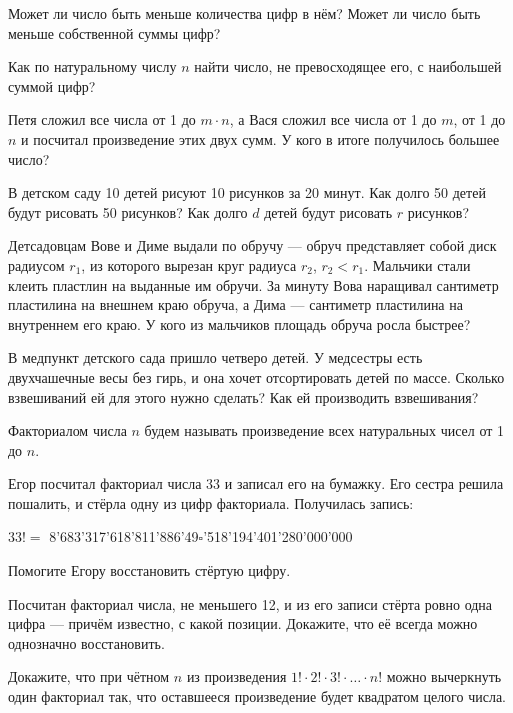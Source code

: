 \begin{itemize}
\itA Может ли число быть меньше количества цифр в нём? Может ли число быть меньше собственной суммы цифр?

\itB Как по натуральному числу $n$ найти число, не превосходящее его, с наибольшей суммой цифр?

\itC Петя сложил все числа от 1 до $m \cdot n$, а Вася сложил все числа от 1 до $m$, от 1 до $n$ и посчитал произведение этих двух сумм. У кого в итоге получилось большее число?
\end{itemize}

\begin{itemize}
\itA В детском саду 10 детей рисуют 10 рисунков за 20 минут. Как долго 50 детей будут рисовать 50 рисунков? Как долго $d$ детей будут рисовать $r$ рисунков?

\itB Детсадовцам Вове и Диме выдали по обручу — обруч представляет собой диск радиусом $r_1$, из которого вырезан круг радиуса $r_2$, $r_2<r_1$. Мальчики стали клеить пластлин на выданные им обручи. За минуту Вова наращивал сантиметр пластилина на внешнем краю обруча, а Дима — сантиметр пластилина на внутреннем его краю. У кого из мальчиков площадь обруча росла быстрее?

\itC В медпункт детского сада пришло четверо детей. У медсестры есть двухчашечные весы без гирь, и она хочет отсортировать детей по массе. Сколько взвешиваний ей для этого нужно сделать? Как ей производить взвешивания?
\end{itemize}

Факториалом числа $n$ будем называть произведение всех натуральных чисел от 1 до $n$.

\begin{itemize}
\itA Егор посчитал факториал числа 33 и записал его на бумажку. Его сестра решила пошалить, и стёрла одну из цифр факториала. Получилась запись: \smallskip \\
\centerline{$33!=$ 8'683'317'618'811'886'49$\square$'518'194'401'280'000'000} \smallskip
Помогите Егору восстановить стёртую цифру.

\itB Посчитан факториал числа, не меньшего 12, и из его записи стёрта ровно одна цифра — причём известно, с какой позиции. Докажите, что её всегда можно однозначно восстановить.

\itC Докажите, что при чётном $n$ из произведения $1! \cdot 2! \cdot 3! \cdot \ldots \cdot n!$ можно вычеркнуть один факториал так, что оставшееся произведение будет квадратом целого числа.
\end{itemize}

